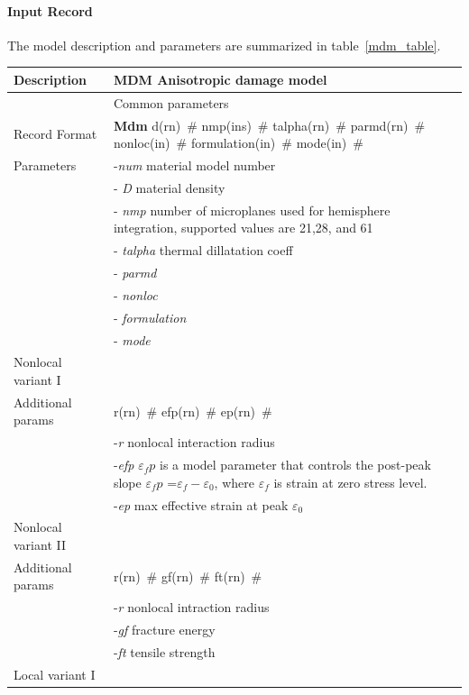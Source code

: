 \documentclass[a4paper]{article}
\newcommand{\descitem}[1]{{\noindent \bf #1}}
\newcommand{\elemparam}[2]{{{#1\tiny (#2)}~\#}}
\newcommand{\param}[1]{{\it #1}}
\begin{document}
\paragraph{Input Record}
The model description and parameters are summarized
in table~\ref{mdm_table}.

\begin{table}[!htb]
\begin{tabular}{|l|p{9cm}|}
\hline
Description & MDM Anisotropic damage model\\
\hline
& Common parameters\\
Record Format & \descitem{Mdm} \elemparam{d}{rn} \elemparam{nmp}{ins} \elemparam{talpha}{rn}
\elemparam{parmd}{rn}  \elemparam{nonloc}{in}
\elemparam{formulation}{in} \elemparam{mode}{in}\\
Parameters & -\param{num} material model number\\
& - \param{D} material density\\
& - \param{nmp} number of microplanes used for hemisphere integration,
supported values are 21,28, and 61\\
& - \param{talpha}  thermal dillatation coeff\\
& - \param{parmd} \\
& - \param{nonloc} \\
& - \param{formulation}\\
& - \param{mode}\\
\hline
Nonlocal variant I&\\
Additional params &\elemparam{r}{rn} \elemparam{efp}{rn}
\elemparam{ep}{rn} \\
& -\param{r} nonlocal interaction radius\\
& -\param{efp} $\varepsilon_fp$ is a model parameter that controls
the post-peak slope $\varepsilon_fp$ =$\varepsilon_f-\varepsilon_0$,
where $\varepsilon_f$ is strain at zero stress level.\\
& -\param{ep} max effective strain at peak $\varepsilon_0$\\
\hline
Nonlocal variant II&\\
Additional params &\elemparam{r}{rn} \elemparam{gf}{rn}
\elemparam{ft}{rn}\\
& -\param{r} nonlocal intraction radius\\
& -\param{gf} fracture energy\\
& -\param{ft} tensile strength\\
\hline
Local variant I&\\

\end{tabular}
\end{table}
\end{document}
